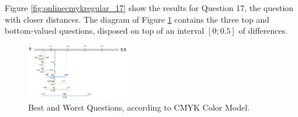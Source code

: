 %
Figure \ref{fig:onlinecmykregular_17} show the results for Question 17, the question with closer
distances. The diagram of Figure \ref{fig:cmyk_analysis} contains the three top and bottom-valued questions, disposed on top of an interval $[0 ; 0.5]$ of differences.
%
\begin{figure}[!htbp]
  \centering
  \includegraphics[width=0.4\textwidth]{images/cmyk_questions_analysis.png}
  \caption{Best and Worst Questions, according to CMYK Color Model.}
  \label{fig:cmyk_analysis}
\end{figure}
%
